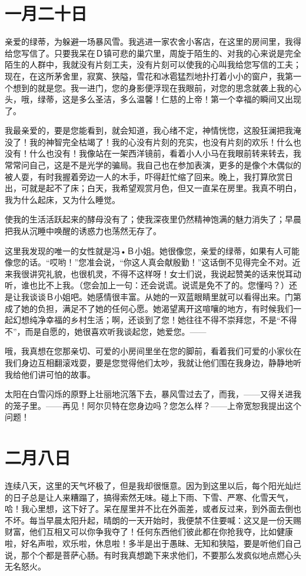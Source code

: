\documentclass[12pt,oneside]{book}
\begin{document}
\chapter{一月二十日}
亲爱的绿蒂，为躲避一场暴风雪。我逃进一家农舍小客店，在这里的房间里，我得给您写信了。只要我呆在Ｄ镇可悲的巢穴里，周旋于陌生的、对我的心来说是完全陌生的人群中，我就没有片刻工夫，没有片刻可以使我的心叫我给您写信的工夫；现在，在这所茅舍里，寂寞、狭隘，雪花和冰雹猛烈地扑打着小小的窗户，我第一个想到的就是您。我一进门，您的身影便浮现在我眼前，对您的思念就袭上我的心头，哦，绿蒂，这是多么圣洁，多么温馨！仁慈的上帝！第一个幸福的瞬间又出现了。

我最亲爱的，要是您能看到，就会知道，我心绪不定，神情恍惚，这股狂澜把我淹没了！我的神智完全枯竭了！我的心没有片刻的充实，也没有片刻的欢乐！什么也没有！什么也没有！我像站在一架西洋镜前，看着小人小马在我眼前转来转去，我常常问自己，这是不是光学的骗局。我自己也在参加表演，更多的是像个木偶似的被人耍，有时我握着旁边一人的木手，吓得赶忙缩了回来。晚上，我打算欣赏日出，可就是起不了床；白天，我希望观赏月色，但又一直呆在房里。我真不明白，我为什么起床，又为什么睡觉。

使我的生活活跃起来的酵母没有了；使我深夜里仍然精神饱满的魅力消失了；早晨把我从沉睡中唤醒的诱惑力也荡然无存了。

这里我发现的唯一的女性就是冯•Ｂ小姐。她很像您，亲爱的绿蒂，如果有人可能像您的话。“哎哟！”您准会说，“你这人真会献殷勤！”这话倒不见得完全不对。近来我很讲究礼貌，也很机灵，不得不这样呀！女士们说，我说起赞美的话来悦耳动听，谁也比不上我。（您会加上一句：还会说谎。说谎是免不了的。您懂吗？）还是让我谈谈Ｂ小姐吧。她感情很丰富。从她的一双蓝眼睛里就可以看得出来。门第成了她的负担，满足不了她的任何心愿。她渴望离开这喧嚷的地方，有时候我们一起幻想纯净幸福的乡村生活；啊，还谈到了您！她往往不得不崇拜您，不是“不得不”，而是自愿的，她很喜欢听我谈起您，她爱您。——

哦，我真想在您那亲切、可爱的小房间里坐在您的脚前，看着我们可爱的小家伙在我们身边互相翻滚戏耍，要是您觉得他们太吵，我就让他们围在我身边，静静地听我给他们讲可怕的故事。

太阳在白雪闪烁的原野上壮丽地沉落下去，暴风雪过去了，而我，——又得关进我的笼子里。——再见！阿尔贝特在您身边吗？您怎么样？——上帝宽恕我提出这个问题！
　　

\chapter{二月八日}
连续八天，这里的天气坏极了，但是我却很惬意。因为到这里以后，每个阳光灿烂的日子总是让人来糟蹋了，搞得索然无味。碰上下雨、下雪、严寒、化雪天气，哈！我心里想，这下好了。呆在屋里并不比在外面差，或者反过来，到外面去倒也不坏。每当早晨太阳升起，晴朗的一天开始时，我便禁不住要喊：这又是一份天赐财富，他们互相又可以你争我夺了！任何东西他们彼此都在你抢我夺，比如健康啦，好名声啦，欢乐啦，休息啦！多半是出于愚昧、无知和狭隘，要是听他们自己说，那个个都是菩萨心肠。有时我真想跪下来求他们，不要那么发疯似地点燃心头无名怒火。
　　
\end{document}
